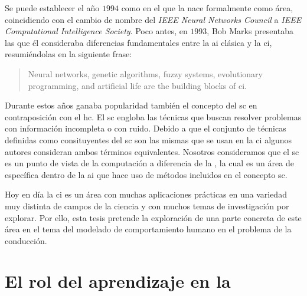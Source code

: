 Se puede establecer el año $1994$ como en el que la  nace formalmente como área, coincidiendo con el cambio de nombre del \textit{IEEE Neural Networks Council} a \textit{IEEE Computational Intelligence Society}. Poco antes, en $1993$, Bob Marks presentaba las que él consideraba diferencias fundamentales entre la \acrshort{ai} clásica y la \acrshort{ci}, resumiéndolas en la siguiente frase:

\blockquote{Neural networks, genetic algorithms, fuzzy systems, evolutionary programming, and artificial life are the building blocks of \ac{ci}.}

Durante estos años ganaba popularidad también el concepto del \gls{sc} en contraposición con el \gls{hc}. El \gls{sc} engloba las técnicas que buscan resolver problemas con información incompleta o con ruido. Debido a que el conjunto de técnicas definidas como consituyentes del \gls{sc} son las mismas que se usan en la \gls{ci} algunos autores consideran ambos términos equivalentes. Nosotros consideramos que el \gls{sc} es un punto de vista de la computación a diferencia de la , la cual es un área de específica dentro de la \gls{ai} que hace uso de métodos incluidos en el concepto \gls{sc}.



Hoy en día la \gls{ci} es un área con muchas aplicaciones prácticas en una variedad muy distinta de campos de la ciencia y con muchos temas de investigación por explorar. Por ello, esta tesis pretende la exploración de una parte concreta de este área en el tema del modelado de comportamiento humano en el problema de la conducción.

\section{El rol del aprendizaje en la }
\label{s:the-learning-role}

